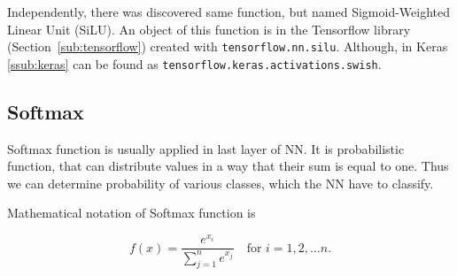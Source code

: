 Independently, there was discovered same function, but named Sigmoid-Weighted Linear Unit (SiLU). \cite{silu} An object of this function is in the Tensorflow library (Section~\ref{sub:tensorflow}) created with \texttt{tensorflow.nn.silu}. Although, in Keras \ref{ssub:keras} can be found as \texttt{tensorflow.keras.activations.swish}.


\subsection{Softmax}%
\label{sub:softmax}

Softmax function is usually applied in last layer of NN. It is probabilistic function, that can distribute values in a way that their sum is equal to one. Thus we can determine probability of various classes, which the NN have to classify.

Mathematical notation of Softmax function is

$$%
	f(x) = \frac{e^{x_i}}{\sum\limits_{j=1}^{n} e^{x_j}} \quad \text{for } i=1,2,\dots n.%
$$

